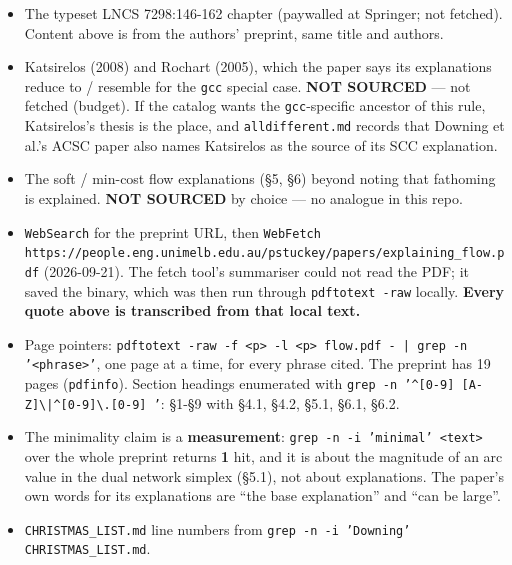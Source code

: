 \documentclass[10pt,a4paper]{article}
\newcommand{\provtag}[2]{{\small\sffamily\bfseries\textcolor{#1}{#2}}}
\newenvironment{pubblock}{%
  \par\smallskip
  \def\FrameCommand{\textcolor{litbar}{\vrule width 2.5pt}\hspace{9pt}}%
  \MakeFramed{\advance\hsize-\width\FrameRestore}}%
  {\endMakeFramed\par\smallskip}
\newcommand{\litsub}[1]{\par\smallskip{\sffamily\bfseries\textcolor{litbar}{#1}\par}}
\begin{document}
\begin{pubblock}
\par\smallskip
\litsub{What was not sourced \ \provtag{tagnotsourced}{NOT SOURCED}}
\begin{itemize}\setlength{\itemsep}{0pt}
\item The typeset LNCS 7298:146-162 chapter (paywalled at Springer; not fetched). Content above is from the authors' preprint, same title and authors.
\item Katsirelos (2008) and Rochart (2005), which the paper says its explanations reduce to / resemble for the \texttt{gcc} special case. \provtag{tagnotsourced}{NOT SOURCED} --- not fetched (budget). If the catalog wants the \texttt{gcc}-specific ancestor of this rule, Katsirelos's thesis is the place, and \texttt{alldifferent.md} records that Downing et al.'s ACSC paper also names Katsirelos as the source of its SCC explanation.
\item The soft / min-cost flow explanations (\S{}5, \S{}6) beyond noting that fathoming is explained. \provtag{tagnotsourced}{NOT SOURCED} by choice --- no analogue in this repo.
\end{itemize}
\par\smallskip
\litsub{How the source file was produced}
{\small
\begin{itemize}\setlength{\itemsep}{0pt}
\item \texttt{WebSearch} for the preprint URL, then \texttt{WebFetch https:/\allowbreak{}/\allowbreak{}people.\allowbreak{}eng.\allowbreak{}unimelb.\allowbreak{}edu.\allowbreak{}au/\allowbreak{}pstuckey/\allowbreak{}papers/\allowbreak{}explaining\_\allowbreak{}flow.\allowbreak{}pdf} (2026-09-21). The fetch tool's summariser could not read the PDF; it saved the binary, which was then run through \texttt{pdftotext -raw} locally. \textbf{Every quote above is transcribed from that local text.}
\item Page pointers: \texttt{pdftotext -\allowbreak{}raw -\allowbreak{}f <p> -\allowbreak{}l <p> flow.\allowbreak{}pdf -\allowbreak{} | grep -\allowbreak{}n '<phrase>'}, one page at a time, for every phrase cited. The preprint has 19 pages (\texttt{pdfinfo}). Section headings enumerated with \texttt{grep -\allowbreak{}n '\textasciicircum{}[0-\allowbreak{}9] [A-\allowbreak{}Z]\textbackslash{}|\textasciicircum{}[0-\allowbreak{}9]\textbackslash{}.\allowbreak{}[0-\allowbreak{}9] '}: \S{}1-\S{}9 with \S{}4.1, \S{}4.2, \S{}5.1, \S{}6.1, \S{}6.2.
\item The minimality claim is a \textbf{measurement}: \texttt{grep -\allowbreak{}n -\allowbreak{}i 'minimal' <text>} over the whole preprint returns \textbf{1} hit, and it is about the magnitude of an arc value in the dual network simplex (\S{}5.1), not about explanations. The paper's own words for its explanations are ``the base explanation'' and ``can be large''.
\item \texttt{CHRISTMAS\_LIST.md} line numbers from \texttt{grep -\allowbreak{}n -\allowbreak{}i 'Downing' CHRISTMAS\_\allowbreak{}LIST.\allowbreak{}md}.
\end{itemize}
\par}
\end{pubblock}
\end{document}
